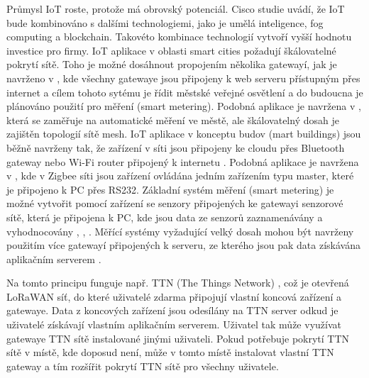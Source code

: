 Průmysl IoT roste, protože má obrovský potenciál. Cisco studie \cite{IoT cisco study} uvádí, že IoT bude kombinováno s dalšími technologiemi, jako je umělá inteligence, fog computing a blockchain. Takovéto kombinace technologií vytvoří vyšší hodnotu investice pro firmy.
IoT aplikace v oblasti smart cities požadují škálovatelné pokrytí sítě. Toho je možné dosáhnout propojením několika gatewayí, jak je navrženo v \cite{Flexible Wireless Sensor Network for smart lighting applications}, kde všechny gatewaye jsou připojeny k web serveru přístupným přes internet a cílem tohoto sytému je řídit městské veřejné osvětlení a do budoucna je plánováno použití pro měření (smart metering).
Podobná aplikace je navržena v \cite{Design and Implementation of an IoT Assisted Real Time ZigBee Mesh WSN}, která se zaměřuje na automatické měření ve městě, ale škálovatelný dosah je zajištěn topologií sítě mesh.
IoT aplikace v konceptu budov (mart buildings) jsou běžně navrženy tak, že zařízení v síti jsou připojeny ke cloudu přes Bluetooth gateway nebo Wi-Fi router připojený k internetu \cite{Internet of Things (IoT) for building Smart Home System}.
Podobná aplikace je navržena  v \cite{Building a Smart Home System with WSN and Service Robot}, kde v Zigbee síti jsou zařízení ovládána jedním zařízením typu master, které je připojeno k PC přes RS232.
Základní systém měření (smart metering) je možné vytvořit pomocí zařízení se senzory připojených ke gatewayi senzorové sítě, která je připojena k PC, kde jsou data ze senzorů zaznamenávány a vyhodnocovány \cite{A Meter Reading System Based on WSN}, \cite{Smart Water Meter System for User-Centric Consumption Measurement}, \cite{Radio Data Infrastructure for Remote Monitoring}.
Měřící systémy vyžadující velký dosah mohou být navrženy použitím více gatewayí připojených k serveru, ze kterého jsou pak data získávána aplikačním serverem \cite{Smart Electric Meter Using LoRA Protocols and Iot applications}. 

Na tomto principu funguje např. TTN (The Things Network) \cite{ttn}, což je otevřená LoRaWAN síť, do které uživatelé zdarma připojují vlastní koncová zařízení a gatewaye. Data z koncových zařízení jsou odesílány na TTN server odkud je uživatelé získávají vlastním aplikačním serverem. Uživatel tak může využívat gatewaye TTN sítě instalované jinými uživateli. Pokud potřebuje pokrytí TTN sítě v místě, kde doposud není, může v tomto místě instalovat vlastní TTN gateway a tím rozšířit pokrytí TTN sítě pro všechny uživatele.


